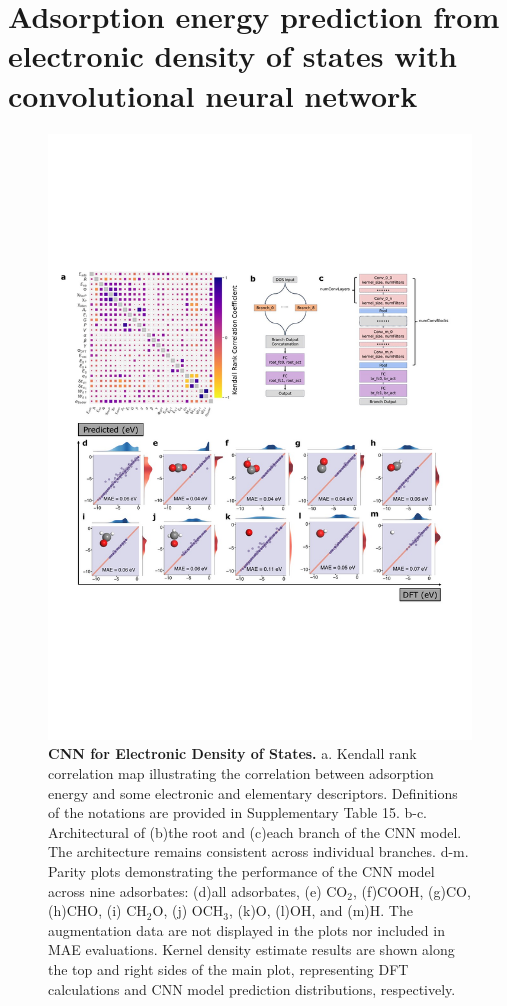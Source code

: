 

\section{Adsorption energy prediction from electronic density of states with convolutional neural network}


\begin{figure}
    \centering
    \includegraphics[width=0.95\linewidth]{main_sections/figures/main_fig2_cnn.JPG}
    \caption{\textbf{CNN for Electronic Density of States.}
    a. Kendall rank correlation map illustrating the correlation between adsorption energy and some electronic and elementary descriptors. Definitions of the notations are provided in Supplementary Table 15.
    b-c. Architectural of (b)the root and (c)each branch of the CNN model. The architecture remains consistent across individual branches.
    d-m. Parity plots demonstrating the performance of the CNN model across nine adsorbates: (d)all adsorbates, (e) $\mathrm{CO_2}$, (f)COOH, (g)CO, (h)CHO, (i) $\mathrm{CH_2O}$, (j) $\mathrm{OCH_3}$, (k)O, (l)OH, and (m)H.
    The augmentation data are not displayed in the plots nor included in MAE evaluations.
    Kernel density estimate results are shown along the top and right sides of the main plot, representing DFT calculations and CNN model prediction distributions, respectively.}
    \label{main_fig2:cnn_for_eads}
\end{figure}



